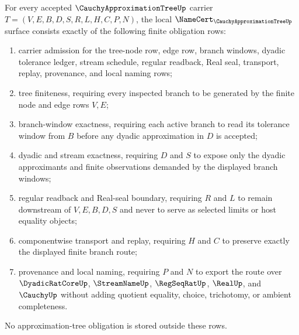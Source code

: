 \begin{theorem}\label{thm:cauchy-approximation-tree-namecert-obligations}
For every accepted $\CauchyApproximationTreeUp$ carrier $T=(V,E,B,D,S,R,L,H,C,P,N)$, the local $\NameCert_{\CauchyApproximationTreeUp}$ surface consists exactly of the following finite obligation rows:
\begin{enumerate}
\item carrier admission for the tree-node row, edge row, branch windows, dyadic tolerance ledger, stream schedule, regular readback, Real seal, transport, replay, provenance, and local naming rows;
\item tree finiteness, requiring every inspected branch to be generated by the finite node and edge rows $V,E$;
\item branch-window exactness, requiring each active branch to read its tolerance window from $B$ before any dyadic approximation in $D$ is accepted;
\item dyadic and stream exactness, requiring $D$ and $S$ to expose only the dyadic approximants and finite observations demanded by the displayed branch windows;
\item regular readback and Real-seal boundary, requiring $R$ and $L$ to remain downstream of $V,E,B,D,S$ and never to serve as selected limits or host equality objects;
\item componentwise transport and replay, requiring $H$ and $C$ to preserve exactly the displayed finite branch route;
\item provenance and local naming, requiring $P$ and $N$ to export the route over $\DyadicRatCoreUp$, $\StreamNameUp$, $\RegSeqRatUp$, $\RealUp$, and $\CauchyUp$ without adding quotient equality, choice, trichotomy, or ambient completeness.
\end{enumerate}
No approximation-tree obligation is stored outside these rows.
\end{theorem}
